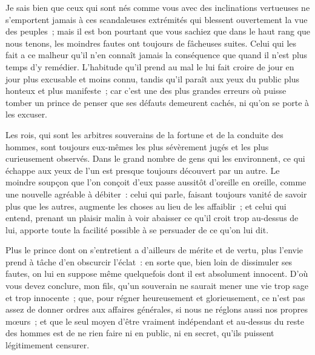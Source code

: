 \documentclass[french,twoside]{book} %
\begin{document}
Je sais bien que ceux qui sont nés comme vous avec des inclinations vertueuses ne s’emportent jamais à ces scandaleuses extrémités qui blessent ouvertement la vue des peuples ; mais il est bon pourtant que vous sachiez que dans le haut rang que nous tenons, les moindres fautes ont toujours de fâcheuses suites. Celui qui les fait a ce malheur qu’il n’en connaît jamais la conséquence que quand il n’est plus temps d’y remédier. L’habitude qu’il prend au mal le lui fait croire de jour en jour plus excusable et moins connu, tandis qu’il paraît aux yeux du public plus honteux et plus manifeste ; car c’est une des plus grandes erreurs où puisse tomber un prince de penser que ses défauts demeurent cachés, ni qu’on se porte à les excuser.\par
Les rois, qui sont les arbitres souverains de la fortune et de la conduite des hommes, sont toujours eux-mêmes les plus sévèrement jugés et les plus curieusement observés. Dans le grand nombre de gens qui les environnent, ce qui échappe aux yeux de l’un est presque toujours découvert par un autre. Le moindre soupçon que l’on conçoit d’eux passe aussitôt d’oreille en oreille, comme une nouvelle agréable à débiter : celui qui parle, faisant toujours vanité de savoir plus que les autres, augmente les choses au lieu de les affaiblir ; et celui qui entend, prenant un plaisir malin à voir abaisser ce qu’il croit trop au-dessus de lui, apporte toute la facilité possible à se persuader de ce qu’on lui dit.\par
Plus le prince dont on s’entretient a d’ailleurs de mérite et de vertu, plus l’envie prend à tâche d’en obscurcir l’éclat : en sorte que, bien loin de dissimuler ses fautes, on lui en suppose même quelquefois dont il est absolument innocent. D’où vous devez conclure, mon fils, qu’un souverain ne saurait mener une vie trop sage et trop innocente ; que, pour régner heureusement et glorieusement, ce n’est pas assez de donner ordres aux affaires générales, si nous ne réglons aussi nos propres mœurs ; et que le seul moyen d’être vraiment indépendant et au-dessus du reste des hommes est de ne rien faire ni en public, ni en secret, qu’ils puissent légitimement censurer.\par
\end{document}
